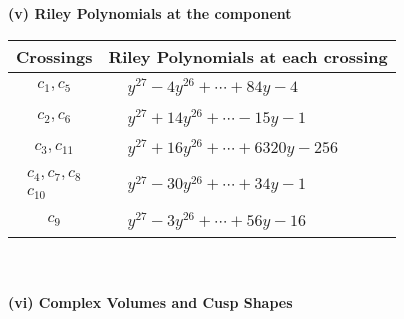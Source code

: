 \documentclass[1p]{elsarticle_modified}
\theoremstyle{definition}
\begin{document}
\newpage\renewcommand{\arraystretch}{1}
\flushleft \textbf{(v) Riley Polynomials at the component}\newline \\
\begin{tabular}{m{50pt}|m{274pt}}
Crossings & \hspace{64pt}Riley Polynomials at each crossing \\
\hline $$\begin{aligned}c_{1},c_{5}\end{aligned}$$&$\begin{aligned}
&y^{27}-4 y^{26}+\cdots+84 y-4
\end{aligned}$\\
\hline $$\begin{aligned}c_{2},c_{6}\end{aligned}$$&$\begin{aligned}
&y^{27}+14 y^{26}+\cdots-15 y-1
\end{aligned}$\\
\hline $$\begin{aligned}c_{3},c_{11}\end{aligned}$$&$\begin{aligned}
&y^{27}+16 y^{26}+\cdots+6320 y-256
\end{aligned}$\\
\hline $$\begin{aligned}c_{4},c_{7},c_{8}\\c_{10}\end{aligned}$$&$\begin{aligned}
&y^{27}-30 y^{26}+\cdots+34 y-1
\end{aligned}$\\
\hline $$\begin{aligned}c_{9}\end{aligned}$$&$\begin{aligned}
&y^{27}-3 y^{26}+\cdots+56 y-16
\end{aligned}$\\
\hline
\end{tabular}\\~\\
\newpage\flushleft \textbf{(vi) Complex Volumes and Cusp Shapes}
\end{document}
